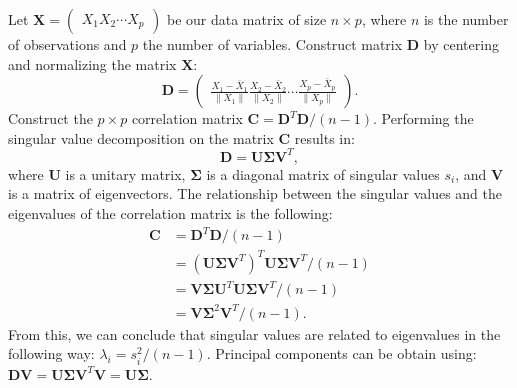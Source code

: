 Let $\mathbf{X} = \begin{pmatrix}X_1 X_2 \cdots X_p \end{pmatrix}$ be our data matrix of size $n \times p$, where $n$ is the number of observations and $p$ the number of variables. Construct matrix $\mathbf{D}$ by centering and normalizing the matrix $\mathbf{X}$:
\begin{equation}
	\mathbf{D} = \begin{pmatrix}
			\frac{X_1 - \bar{X}_1}{\lVert X_1 \rVert} \frac{X_2 - \bar{X}_2}{\lVert X_2 \rVert} \cdots \frac{X_p - \bar{X}_p}{\lVert X_p \rVert} 
		\end{pmatrix}.
\end{equation}
Construct the $p \times p$ correlation matrix $\mathbf{C} = \mathbf{D}^T\mathbf{D} / (n - 1)$. 
Performing the singular value decomposition on the matrix $\mathbf{C}$ results in:
\begin{equation}
	\mathbf{D} = \mathbf{U}\mathbf{\Sigma}\mathbf{V}^T,
\end{equation}
where $\mathbf{U}$ is a unitary matrix, $\mathbf{\Sigma}$ is a diagonal matrix of singular values $s_i$, and $\mathbf{V}$ is a matrix of eigenvectors. 
The relationship between the singular values and the eigenvalues of the correlation matrix is the following:
\begin{equation}
\begin{aligned}
	\mathbf{C} &= \mathbf{D}^T\mathbf{D} / (n - 1) \\
	&= (\mathbf{U}\mathbf{\Sigma}\mathbf{V}^T)^T\mathbf{U}\mathbf{\Sigma}\mathbf{V}^T / (n - 1) \\
	&= \mathbf{V}\mathbf{\Sigma}\mathbf{U}^T\mathbf{U}\mathbf{\Sigma}\mathbf{V}^T / (n - 1) \\
	&= \mathbf{V}\mathbf{\Sigma}^2\mathbf{V}^T / (n - 1).
\end{aligned}
\end{equation}
From this, we can conclude that singular values are related to eigenvalues in the following way: $\lambda_i = s_i^2 / (n-1)$. Principal components can be obtain using: $\mathbf{D}\mathbf{V} = \mathbf{U}\mathbf{\Sigma}\mathbf{V}^T\mathbf{V} = \mathbf{U}\mathbf{\Sigma}$.

